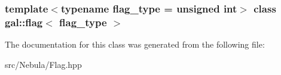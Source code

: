 \subsubsection*{template$<$typename flag\-\_\-type = unsigned int$>$ class gal\-::flag$<$ flag\-\_\-type $>$}



\-The documentation for this class was generated from the following file\-:\begin{DoxyCompactItemize}
\item 
src/\-Nebula/\-Flag.\-hpp\end{DoxyCompactItemize}
